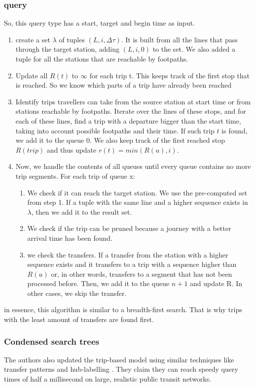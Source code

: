 \subsubsection{ query}
So, this query type has a start, target and begin time as input. 
\begin{enumerate}
    \item create a set $\lambda$ of tuples $(L, i,\Delta\tau)$. It is built from all the lines that pass through the target station, adding $(L, i,0)$ to the set. We also added a tuple for all the stations that are reachable by footpaths.
    \item Update all $R(t)$ to $\infty$ for each trip t. This keeps track of the first stop that is reached. So we know which parts of a trip have already been reached
    \item Identify trips travellers can take from the source station at start time or from stations reachable by footpaths. Iterate over the lines of these stops, and for each of these lines, find a trip with a departure bigger than the start time, taking into account possible footpaths and their time. If such trip $t$ is found, we add it to the queue 0. We also keep track of the first reached stop $R(trip)$ and thus update $r(t) = min(R(u), i)$. 
    \item Now, we handle the contents of all queues until every queue contains no more trip segments. For each trip of queue x:\begin{enumerate}
        \item We check if it can reach the target station. We use the pre-computed set from step 1. If a tuple with the same line and a higher sequence exists in $\lambda$, then we add it to the result set.
        \item We check if the trip can be pruned because a journey with a better arrival time has been found. 
        \item we check the transfers. If a transfer from the station with a higher sequence exists and it transfers to a trip with a sequence higher than $R(u)$ or, in other words, transfers to a segment that has not been processed before. Then, we add it to the queue $n+1$ and update R. In other cases, we skip the transfer.
    \end{enumerate}  
\end{enumerate}
in essence, this algorithm is similar to a breadth-first search. That is why trips with the least amount of transfers are found first. 

\subsubsection{Condensed search trees}
The authors also updated the trip-based model using similar techniques like transfer patterns and hub-labelling \cite{witt_trip-based_2016}. They claim they can reach speedy query times of half a millisecond on large, realistic public transit networks. 
